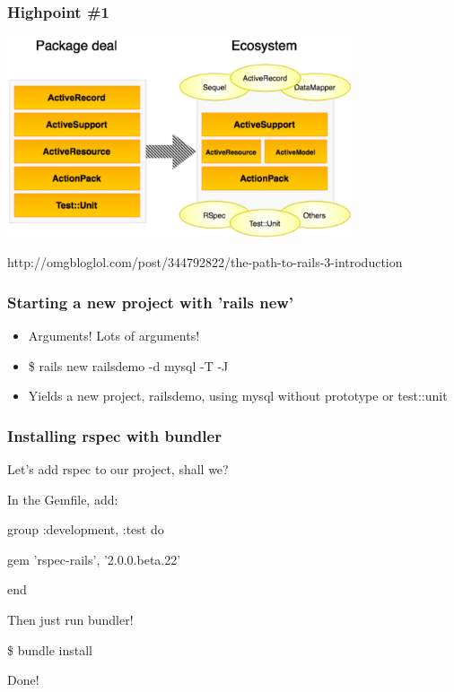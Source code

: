 \documentclass{beamer}
\begin{document}
\begin{frame}
\frametitle{Highpoint \#1}

\includegraphics[width=4in]{omgbloglol_rails3_packaging.png}

http://omgbloglol.com/post/344792822/the-path-to-rails-3-introduction
\end{frame}



\begin{frame}
\frametitle{Starting a new project with 'rails new'}

\begin{itemize}
\item Arguments! Lots of arguments!
\item \begin{semiverbatim}\$ rails new railsdemo -d mysql -T -J \end{semiverbatim}

\item Yields a new project, railsdemo, using mysql without prototype or test::unit
\end{itemize}
\end{frame}


\begin{frame}
\frametitle{Installing rspec with bundler}

Let's add rspec to our project, shall we?
\pause

In the Gemfile, add:
\begin{semiverbatim}
group :development, :test do

     gem 'rspec-rails', '2.0.0.beta.22'
     
end
\end{semiverbatim}
\pause
Then just run bundler!

\begin{semiverbatim}
\$ bundle install
\end{semiverbatim}

\pause

Done!
\end{frame}
\end{document}
